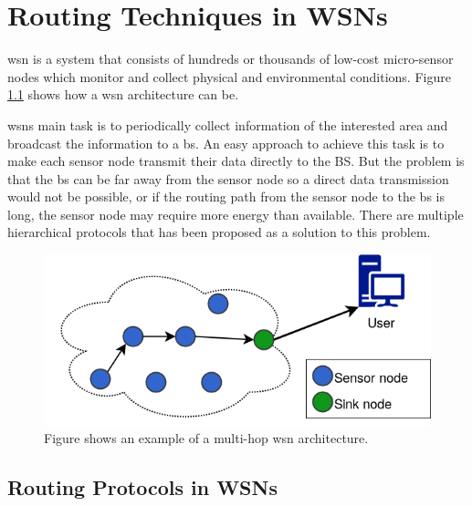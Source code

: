 \documentclass[USenglish]{uit-thesis}
\newcommand{\definition}[1]{%
  \refstepcounter{definition}%
  \par\noindent\textbf{The Definition~\thedefinition. #1}%
  \addcontentsline{def}{definition}
    {\protect\numberline{\thechapter.\thedefinition}#1}\par%
}
\begin{document}



\chapter{Routing Techniques in WSNs}

\gls{wsn} is a system that consists of hundreds or thousands of low-cost micro-sensor nodes which monitor and collect physical and environmental conditions. Figure \ref{fig:wsn} shows how a \gls{wsn} architecture can be. 

\gls{wsn}s  main task is to periodically collect information of the interested area and broadcast the information to a \gls{bs}. An easy approach to achieve this task is to make each sensor node transmit their data directly to the BS. But the problem is that the \gls{bs} can be far away from the sensor node so a direct data transmission would not be possible, or if the routing path from the sensor node to the \gls{bs} is long, the sensor node may require more energy than available. There are multiple hierarchical protocols that has been proposed as a solution to this problem.

\begin{figure}
\centering
\includegraphics[width=\textwidth]{wsn.png}
\caption{Figure shows an example of a multi-hop \gls{wsn} architecture.}
\label{fig:wsn}
\end{figure}


\section{Routing Protocols in WSNs}
\end{document}
